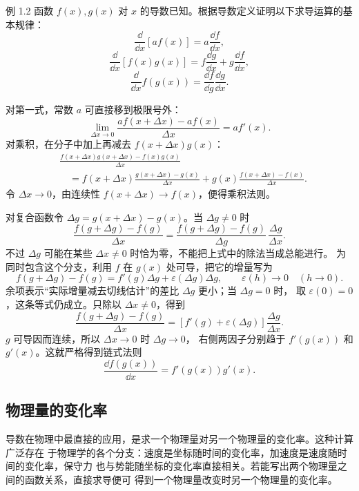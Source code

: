 \begin{origexamplebox}{例 1.2}
函数 $f(x),g(x)$ 对 $x$ 的导数已知。根据导数定义证明以下求导运算的基本规律：
\[
 \frac{\dd}{\dd x}[a f(x)]=a\frac{\dd f}{\dd x},
\]
\[
 \frac{\dd}{\dd x}[f(x)g(x)]
 =f\frac{\dd g}{\dd x}+g\frac{\dd f}{\dd x},
\]
\[
 \frac{\dd}{\dd x}f(g(x))=\frac{\dd f}{\dd g}\frac{\dd g}{\dd x}.
\]
\end{origexamplebox}

\begin{xesolution}
对第一式，常数 $a$ 可直接移到极限号外：
\[
 \lim_{\Delta x\to0}\frac{af(x+\Delta x)-af(x)}{\Delta x}
 =a f'(x).
\]
对乘积，在分子中加上再减去 $f(x+\Delta x)g(x)$：
\begin{align*}
 &\frac{f(x+\Delta x)g(x+\Delta x)-f(x)g(x)}{\Delta x}\\
 &\quad=f(x+\Delta x)\frac{g(x+\Delta x)-g(x)}{\Delta x}
 +g(x)\frac{f(x+\Delta x)-f(x)}{\Delta x}.
\end{align*}
令 $\Delta x\to0$，由连续性 $f(x+\Delta x)\to f(x)$，便得乘积法则。

对复合函数令 $\Delta g=g(x+\Delta x)-g(x)$。当 $\Delta g\ne0$ 时
\[
 \frac{f(g+\Delta g)-f(g)}{\Delta x}
 =\frac{f(g+\Delta g)-f(g)}{\Delta g}\,
  \frac{\Delta g}{\Delta x}.
\]
不过 $\Delta g$ 可能在某些 $\Delta x\ne0$ 时恰为零，不能把上式中的除法当成总能进行。
为同时包含这个分支，利用 $f$ 在 $g(x)$ 处可导，把它的增量写为
\[
 f(g+\Delta g)-f(g)=f'(g)\Delta g+\varepsilon(\Delta g)\Delta g,
 \qquad \varepsilon(h)\to0\quad(h\to0).
\]
余项表示“实际增量减去切线估计”的差比 $\Delta g$ 更小；当 $\Delta g=0$ 时，
取 $\varepsilon(0)=0$，这条等式仍成立。只除以 $\Delta x\ne0$，得到
\[
 \frac{f(g+\Delta g)-f(g)}{\Delta x}
 =[f'(g)+\varepsilon(\Delta g)]\frac{\Delta g}{\Delta x}.
\]
$g$ 可导因而连续，所以 $\Delta x\to0$ 时 $\Delta g\to0$，
右侧两因子分别趋于 $f'(g(x))$ 和 $g'(x)$。这就严格得到链式法则
\[
 \boxed{\frac{\dd f(g(x))}{\dd x}=f'(g(x))g'(x)}.
\]
\end{xesolution}

\subsection{物理量的变化率}

导数在物理中最直接的应用，是求一个物理量对另一个物理量的变化率。这种计算广泛存在
于物理学的各个分支：速度是坐标随时间的变化率，加速度是速度随时间的变化率，保守力
也与势能随坐标的变化率直接相关。若能写出两个物理量之间的函数关系，直接求导便可
得到一个物理量改变时另一个物理量的变化率。

